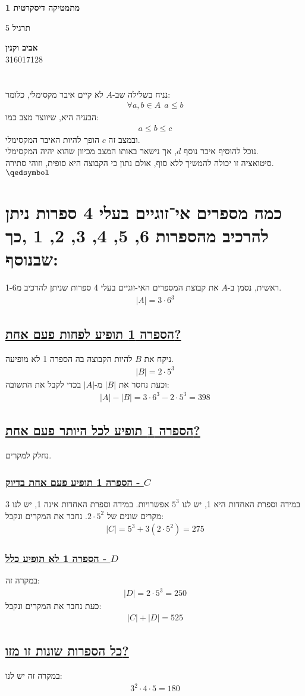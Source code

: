 \documentclass[a4paper, 12pt, leqno]{article}
\newcommand{\sub}[1]{\subsection{\underline{#1}}}
\newcommand{\subsub}[1]{\subsubsection{\underline{#1}}}
\newcommand{\eq}[1]{\begin{align*}#1\end{align*}}
\renewcommand{\qed}{\hfill\(\qedsymbol\)}
\renewcommand{\leq}{\leqslant}
\begin{document}
\begin{titlepage}
    \begin{center}
        \vspace*{4cm}
    
        {\fontsize{32pt}{32pt}\selectfont \textbf{מתמטיקה דיסקרטית 1}}
        
        \vspace{0.4cm}
        
        {\LARGE
        תרגיל 5}
    
        \vfill
            
        {
            \Large\textbf{אביב וקנין}
            \\
            316017128
        }
    \end{center}
\end{titlepage}



\setcounter{section}{2}
\section{}
נניח בשלילה שב-$A$ לא קיים איבר מקסימלי, כלומר:
\eq{
    \forall{a,b}\in{A}~~a\leq{b}
}
הבעיה היא, שיווצר מצב כמו:
\eq{
    a\leq{b}\leq{c}
}
ובמצב זה $c$ הופך להיות האיבר המקסימלי.\\
נוכל להוסיף איבר נוסף $d$, אך נישאר באותו המצב מכיוון שהוא יהיה המקסימלי.\\
סיטואציה זו יכולה להמשיך ללא סוף, אולם נתון כי הקבוצה היא סופית, וזוהי סתירה.
\qed

\section{כמה מספרים אי־זוגיים בעלי 4 ספרות ניתן להרכיב מהספרות 6, 5, 4, 3, 2, 1 ,כך שבנוסף:}
ראשית, נסמן ב-$A$ את קבוצת המספרים האי-זוגיים בעלי 4 ספרות שניתן להרכיב מ1-6.
\eq{
    |A|=3\cdot6^3
}
\sub{הספרה 1 תופיע לפחות פעם אחת?}
ניקח את $B$ להיות הקבוצה בה הספרה 1 לא מופיעה.
\eq{
    |B|=2\cdot5^3
}
וכעת נחסר את $|B|$ מ-$|A|$ בכדי לקבל את התשובה:
\eq{
    |A|-|B|=3\cdot6^3-2\cdot5^3=398
}
\sub{הספרה 1 תופיע לכל היותר פעם אחת?}
נחלק למקרים.
\subsub{הספרה 1 תופיע פעם אחת בדיוק - $C$}
במידה וספרת האחדות היא 1, יש לנו $5^3$ אפשרויות.
במידה וספרת האחדות אינה 1, יש לנו 3 מקרים שונים של $2\cdot5^2$.
נחבר את המקרים ונקבל:
\eq{
    |C| = 5^3+3(2\cdot5^2) = 275
}
\subsub{הספרה 1 לא תופיע כלל - $D$}
במקרה זה:
\eq{
    |D|=2\cdot5^3=250
}
כעת נחבר את המקרים ונקבל:
\eq{
    |C|+|D|=525
}
\sub{כל הספרות שונות זו מזו?}
במקרה זה יש לנו:
\eq{
    3^2\cdot4\cdot5=180
}
\end{document}

